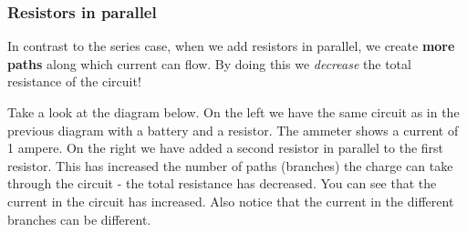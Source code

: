 \subsubsection{Resistors in parallel}
In contrast to the series case, when we add resistors in parallel, we create \textbf{more paths} along which current can flow. By doing this we \textit{decrease} the total resistance of the circuit! 

Take a look at the diagram below. On the left we have the same circuit as in the previous diagram with a battery and a resistor. The ammeter shows a current of 1 ampere. On the right we have added a second resistor in parallel to the first resistor. This has increased the number of paths (branches) the charge can take through the circuit - the total resistance has decreased. You can see that the current in the circuit has increased. Also notice that the current in the different branches can be different.

